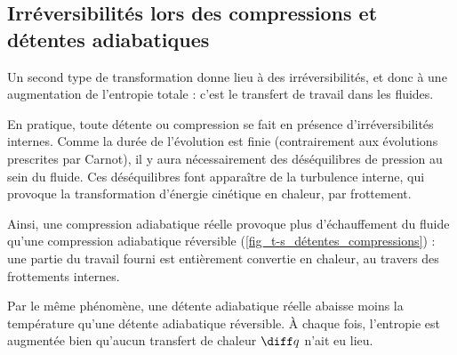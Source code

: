 	\subsection{Irréversibilités lors des compressions et détentes adiabatiques}

		Un second type de transformation donne lieu à des irréversibilités, et donc à une augmentation de l’entropie totale : c’est le transfert de travail dans les fluides.

		En pratique, toute détente ou compression se fait en présence d’irréversibilités internes. Comme la durée de l’évolution est finie (contrairement aux évolutions prescrites par Carnot), il y aura nécessairement des déséquilibres de pression au sein du fluide. Ces déséquilibres font apparaître de la turbulence interne, qui provoque la transformation d’énergie cinétique en chaleur, par frottement.

		Ainsi, une compression adiabatique réelle provoque plus d’échauffement du fluide qu’une compression adiabatique réversible (\cref{fig_t-s_détentes_compressions}) : une partie du travail fourni est entièrement convertie en chaleur, au travers des frottements internes.

		Par le même phénomène, une détente adiabatique réelle abaisse moins la température qu’une détente adiabatique réversible. À chaque fois, l’entropie est augmentée bien qu’aucun transfert de chaleur $\diff q$ n’ait eu lieu.
		
